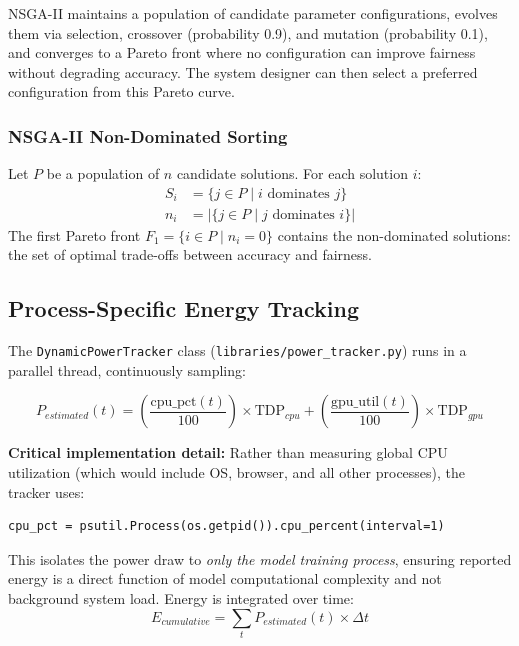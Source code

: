 \documentclass[12pt,a4paper]{article}
\begin{document}
NSGA-II maintains a population of candidate parameter configurations, evolves them via selection, crossover (probability 0.9), and mutation (probability 0.1), and converges to a Pareto front where no configuration can improve fairness without degrading accuracy. The system designer can then select a preferred configuration from this Pareto curve.

\subsubsection{NSGA-II Non-Dominated Sorting}
Let $P$ be a population of $n$ candidate solutions. For each solution $i$:
\begin{align}
    S_i &= \{j \in P \mid i \text{ dominates } j\} \\
    n_i &= |\{j \in P \mid j \text{ dominates } i\}|
\end{align}
The first Pareto front $F_1 = \{i \in P \mid n_i = 0\}$ contains the non-dominated solutions: the set of optimal trade-offs between accuracy and fairness.

\subsection{Process-Specific Energy Tracking}

The \texttt{DynamicPowerTracker} class (\texttt{libraries/power\_tracker.py}) runs in a parallel thread, continuously sampling:

\begin{equation}
    P_{estimated}(t) = \left(\frac{\text{cpu\_pct}(t)}{100}\right) \times \text{TDP}_{cpu} + \left(\frac{\text{gpu\_util}(t)}{100}\right) \times \text{TDP}_{gpu}
\end{equation}

\textbf{Critical implementation detail:} Rather than measuring global CPU utilization (which would include OS, browser, and all other processes), the tracker uses:

\begin{verbatim}
cpu_pct = psutil.Process(os.getpid()).cpu_percent(interval=1)
\end{verbatim}

This isolates the power draw to \textit{only the model training process}, ensuring reported energy is a direct function of model computational complexity and not background system load. Energy is integrated over time:
\begin{equation}
    E_{cumulative} = \sum_{t} P_{estimated}(t) \times \Delta t
\end{equation}
\end{document}

